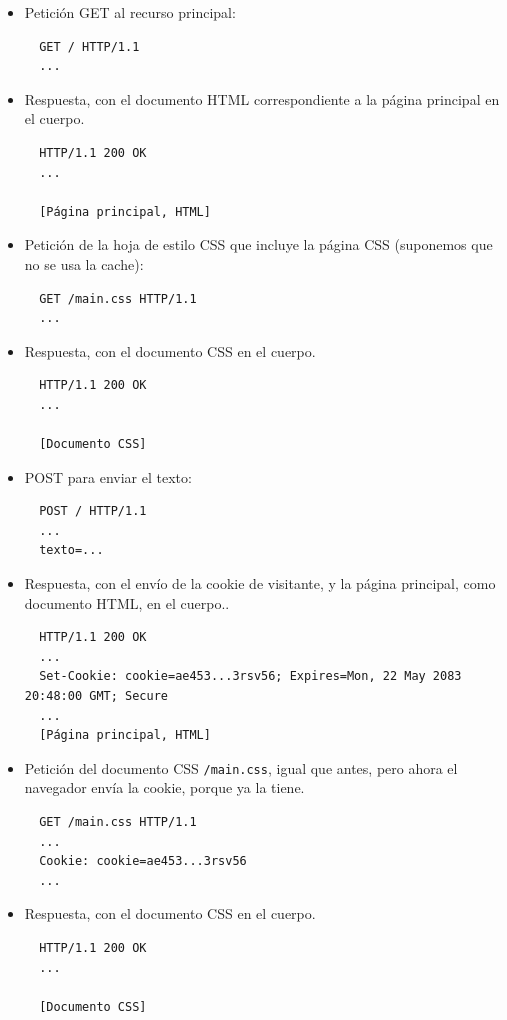 \begin{itemize}

\item Petición GET al recurso principal: 

\begin{verbatim}
  GET / HTTP/1.1
  ...
\end{verbatim}

\item Respuesta, con el documento HTML correspondiente a la página principal en el cuerpo.

\begin{verbatim}
  HTTP/1.1 200 OK
  ...

  [Página principal, HTML]
\end{verbatim}

\item Petición de la hoja de estilo CSS que incluye la página CSS (suponemos que no se usa la cache):

\begin{verbatim}
  GET /main.css HTTP/1.1
  ...
\end{verbatim}

\item Respuesta, con el documento CSS en el cuerpo.

\begin{verbatim}
  HTTP/1.1 200 OK
  ...

  [Documento CSS]
\end{verbatim}

\item POST para enviar el texto:

\begin{verbatim}
  POST / HTTP/1.1
  ...
  texto=...
\end{verbatim}

\item Respuesta, con el envío de la cookie de visitante, y la página principal, como documento HTML, en el cuerpo..

\begin{verbatim}
  HTTP/1.1 200 OK
  ...
  Set-Cookie: cookie=ae453...3rsv56; Expires=Mon, 22 May 2083 20:48:00 GMT; Secure
  ...
  [Página principal, HTML]
\end{verbatim}
  

\item Petición del documento CSS \texttt{/main.css}, igual que antes, pero ahora el navegador envía la cookie, porque ya la tiene.

\begin{verbatim}
  GET /main.css HTTP/1.1
  ...
  Cookie: cookie=ae453...3rsv56
  ...
\end{verbatim}

\item Respuesta, con el documento CSS en el cuerpo.

\begin{verbatim}
  HTTP/1.1 200 OK
  ...

  [Documento CSS]
\end{verbatim}


\end{itemize}



